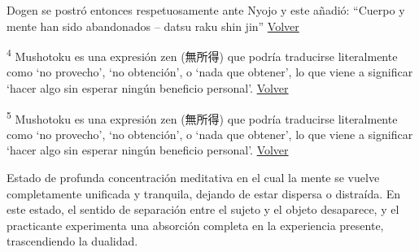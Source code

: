 \documentclass[
  a5paperpaper,
]{article}
\begin{document}
Dogen se postró entonces respetuosamente ante Nyojo y este añadió:
``Cuerpo y mente han sido abandonados -- datsu raku shin jin''
\protect\hyperlink{ref3}{Volver}

\textsuperscript{4} Mushotoku es una expresión zen (無所得) que podría
traducirse literalmente como `no provecho', `no obtención', o `nada que
obtener', lo que viene a significar `hacer algo sin esperar ningún
beneficio personal'. \protect\hyperlink{ref4}{Volver}

\textsuperscript{5} Mushotoku es una expresión zen (無所得) que podría
traducirse literalmente como `no provecho', `no obtención', o `nada que
obtener', lo que viene a significar `hacer algo sin esperar ningún
beneficio personal'. \protect\hyperlink{ref4}{Volver}

Estado de profunda concentración meditativa en el cual la mente se
vuelve completamente unificada y tranquila, dejando de estar dispersa o
distraída. En este estado, el sentido de separación entre el sujeto y el
objeto desaparece, y el practicante experimenta una absorción completa
en la experiencia presente, trascendiendo la dualidad.\\

\hfill\break
\end{document}
